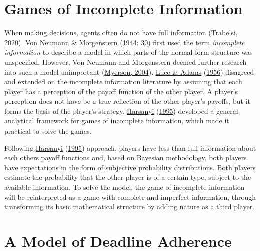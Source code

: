 \documentclass[11pt,preprint, authoryear]{elsarticle}
\numberwithin{equation}{section}
\numberwithin{figure}{section}
\numberwithin{table}{section}
\begin{document}
\hypertarget{games-of-incomplete-information}{%
\section{\texorpdfstring{Games of Incomplete Information
\label{lit}}{Games of Incomplete Information }}\label{games-of-incomplete-information}}

When making decisions, agents often do not have full information
(\protect\hyperlink{ref-2020games}{Trabelsi, 2020}).
\protect\hyperlink{ref-von}{Von Neumann \& Morgenstern}
(\protect\hyperlink{ref-von}{1944: 30}) first used the term
\emph{incomplete information} to describe a model in which parts of the
normal form structure was unspecified. However, Von Neumann and
Morgenstern deemed further research into such a model unimportant
(\protect\hyperlink{ref-2004com}{Myerson, 2004}).
\protect\hyperlink{ref-luce1956}{Luce \& Adams}
(\protect\hyperlink{ref-luce1956}{1956}) disagreed and extended on the
incomplete information literature by assuming that each player has a
perception of the payoff function of the other player. A player's
perception does not have be a true reflection of the other player's
payoffs, but it forms the basis of the player's strategy.
\protect\hyperlink{ref-harsanyi}{Harsanyi}
(\protect\hyperlink{ref-harsanyi}{1995}) developed a general analytical
framework for games of incomplete information, which made it practical
to solve the games.

Following \protect\hyperlink{ref-harsanyi}{Harsanyi}
(\protect\hyperlink{ref-harsanyi}{1995}) approach, players have less
than full information about each others payoff functions and, based on
Bayesian methodology, both players have expectations in the form of
subjective probability distributions. Both players estimate the
probability that the other player is of a certain type, subject to the
available information. To solve the model, the game of incomplete
information will be reinterpreted as a game with complete and imperfect
information, through transforming its basic mathematical structure by
adding nature as a third player.

\hypertarget{a-model-of-deadline-adherence}{%
\section{\texorpdfstring{A Model of Deadline Adherence
\label{game}}{A Model of Deadline Adherence }}\label{a-model-of-deadline-adherence}}
\end{document}
